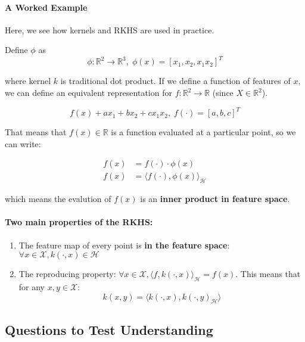\documentclass[12pt]{article}
\begin{document}
\paragraph{A Worked Example} Here, we see how kernels and RKHS are used in practice.

\noindent Define $\phi$ as 
\begin{equation}
    \phi: \mathbb{R}^2 \rightarrow \mathbb{R}^3, \; \phi(x) = [x_1, x_2, x_1x_2]^T
\end{equation} 

\noindent  where kernel $k$ is traditional dot product. If we define a function of features of $x$, we can define an equivalent representation for $f: \mathbb{R}^2 \rightarrow \mathbb{R}$ (since $X \in \mathbb{R}^2$).

\begin{equation}
f(x) + ax_1 + bx_2 + cx_1x_2, \; f(\cdot) = [a, b,  c]^T
\end{equation} 

\noindent That means that $f(x) \in \mathbb{R}$ is a function evaluated at a particular point, so we can write:

\begin{align}
    f(x) &= f(\cdot) \cdot \phi(x) \\
    f(x) &= \langle f(\cdot), \phi(x)\rangle_\mathcal{H}
\end{align}


\noindent which means the evalution of $f(x)$ is an \textbf{inner product in feature space}.

\paragraph{Two main properties of the RKHS:}

\begin{enumerate}
    \item The feature map of every point is \textbf{in the feature space}: $\forall x \in \mathcal{X}, k(\cdot, x) \in \mathcal{H}$
    \item The reproducing property: $\forall x \in \mathcal{X}, \langle f, k(\cdot, x) \rangle_\mathcal{H} = f(x)$. 
    This means that for any $x, y \in \mathcal{X}$: 
    \begin{equation}
        k(x, y) = \langle k(\cdot, x), k(\cdot, y)_\mathcal{H} \rangle
    \end{equation}
\end{enumerate}

\subsection{Questions to Test Understanding}
\label{sec:ques-rkhs}
\end{document}
